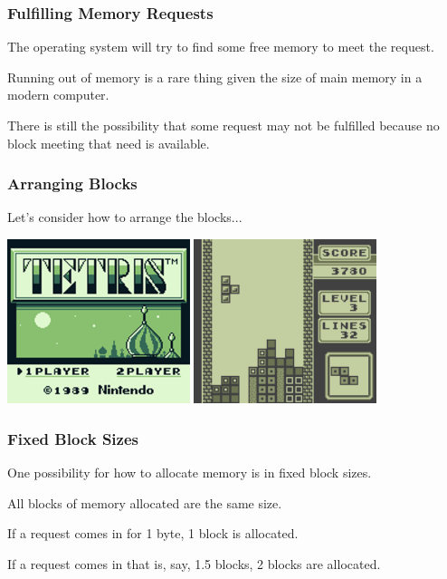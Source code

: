 \begin{frame}
\frametitle{Fulfilling Memory Requests}

The operating system will try to find some free memory to meet the request. 

Running out of memory is a rare thing given the size of main memory in a modern computer.

There is still the possibility that some request may not be fulfilled because no block meeting that need is available.

\end{frame}


\begin{frame}
\frametitle{Arranging Blocks}

Let's consider how to arrange the blocks...

\begin{center}
	\includegraphics[width=0.4\textwidth]{images/Tetris01.png}
	\includegraphics[width=0.4\textwidth]{images/Tetris02.png}
\end{center}


\end{frame}


\begin{frame}
\frametitle{Fixed Block Sizes}

One possibility for how to allocate memory is in fixed block sizes. 

All blocks of memory allocated are the same size. 

If a request comes in for 1 byte, 1 block is allocated. 

If a request comes in that is, say, 1.5 blocks, 2 blocks are allocated. 


\end{frame}

